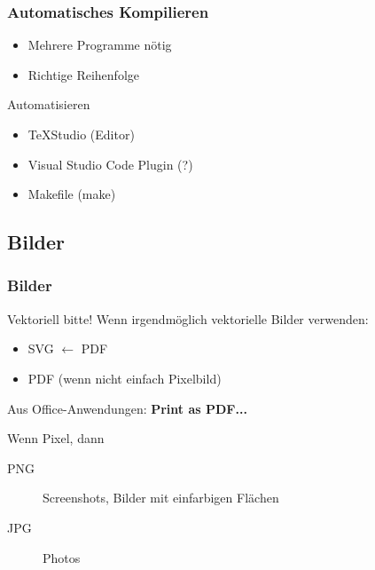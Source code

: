 \documentclass{beamer}
\begin{document}
\begin{frame}
	\frametitle{Automatisches Kompilieren}
	\begin{itemize}
		\item Mehrere Programme nötig
		\item Richtige Reihenfolge
	\end{itemize}
	\begin{block}{Automatisieren}
		\begin{itemize}
			\item TeXStudio (Editor)
			\item Visual Studio Code Plugin (?)
			\item Makefile (make)
		\end{itemize}
	\end{block}
\end{frame}

\subsection{Bilder}
\begin{frame}
	\frametitle{Bilder}

	\begin{block}{Vektoriell bitte!}
		Wenn irgendmöglich vektorielle Bilder verwenden:
		\begin{itemize}
			\item SVG $\leftarrow$ PDF
			\item PDF (wenn nicht einfach Pixelbild)
		\end{itemize}
		Aus Office-Anwendungen: {\bf Print as PDF...}
	\end{block}
	\begin{block}{Wenn Pixel, dann}
		\begin{description}
			\item[PNG] Screenshots, Bilder mit einfarbigen Flächen
			\item[JPG] Photos
		\end{description}
	\end{block}
\end{frame}
\end{document}
